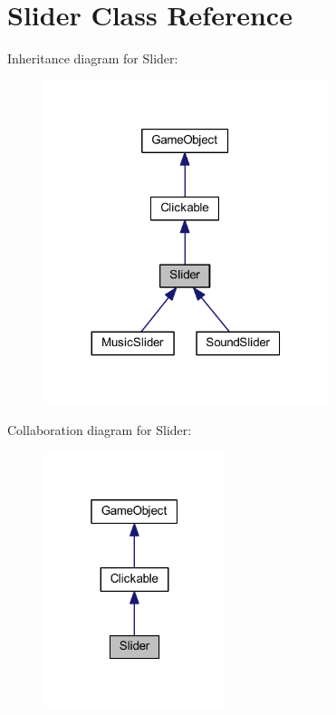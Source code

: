 \hypertarget{class_slider}{\section{Slider Class Reference}
\label{class_slider}
}


Inheritance diagram for Slider\+:\nopagebreak
\begin{figure}[H]
\begin{center}
\leavevmode
\includegraphics[width=236pt]{class_slider__inherit__graph}
\end{center}
\end{figure}


Collaboration diagram for Slider\+:\nopagebreak
\begin{figure}[H]
\begin{center}
\leavevmode
\includegraphics[width=151pt]{class_slider__coll__graph}
\end{center}
\end{figure}

